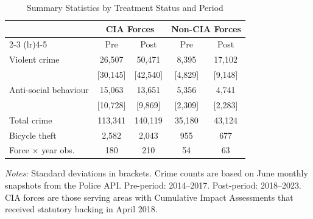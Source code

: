 \begin{table}[H]
\centering
\caption{Summary Statistics by Treatment Status and Period}
\label{tab:summary}
\begin{threeparttable}
\begin{tabular}{lcccc}
\toprule
 & \multicolumn{2}{c}{CIA Forces} & \multicolumn{2}{c}{Non-CIA Forces} \\
\cmidrule(lr){2-3} \cmidrule(lr){4-5}
 & Pre & Post & Pre & Post \\
\midrule
Violent crime & 26,507 & 50,471 & 8,395 & 17,102 \\
 & [30,145] & [42,540] & [4,829] & [9,148] \\
Anti-social behaviour & 15,063 & 13,651 & 5,356 & 4,741 \\
 & [10,728] & [9,869] & [2,309] & [2,283] \\
Total crime & 113,341 & 140,119 & 35,180 & 43,124 \\
Bicycle theft & 2,582 & 2,043 & 955 & 677 \\
\midrule
Force $\times$ year obs. & 180 & 210 & 54 & 63 \\
\bottomrule
\end{tabular}
\begin{tablenotes}[flushleft]
\footnotesize
\item \textit{Notes:} Standard deviations in brackets. Crime counts are based on June monthly snapshots from the Police API. Pre-period: 2014--2017. Post-period: 2018--2023. CIA forces are those serving areas with Cumulative Impact Assessments that received statutory backing in April 2018.
\end{tablenotes}
\end{threeparttable}
\end{table}
